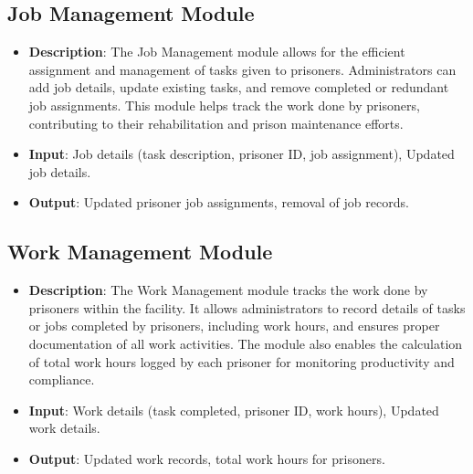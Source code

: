 \subsection*{Job Management Module}
\begin{itemize}
    \item \textbf{Description}: The Job Management module allows for the efficient assignment and management of tasks given to prisoners. Administrators can add job details, update existing tasks, and remove completed or redundant job assignments. This module helps track the work done by prisoners, contributing to their rehabilitation and prison maintenance efforts.
    \item \textbf{Input}: Job details (task description, prisoner ID, job assignment), Updated job details.
    \item \textbf{Output}: Updated prisoner job assignments, removal of job records.
\end{itemize}

\subsection*{Work Management Module}
\begin{itemize}
    \item \textbf{Description}: The Work Management module tracks the work done by prisoners within the facility. It allows administrators to record details of tasks or jobs completed by prisoners, including work hours, and ensures proper documentation of all work activities. The module also enables the calculation of total work hours logged by each prisoner for monitoring productivity and compliance.
    \item \textbf{Input}: Work details (task completed, prisoner ID, work hours), Updated work details.
    \item \textbf{Output}: Updated work records, total work hours for prisoners.
\end{itemize}